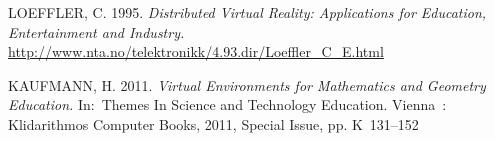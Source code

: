 \begin{thebibliography}{1}

LOEFFLER, C. 1995. \emph{Distributed Virtual Reality: Applications for Education, Entertainment and Industry.} \url{http://www.nta.no/telektronikk/4.93.dir/Loeffler_C_E.html}

KAUFMANN, H. 2011. \emph{Virtual Environments for Mathematics and Geometry Education.} In:~Themes In Science and Technology Education. Vienna~: Klidarithmos Computer Books, 2011, Special Issue, pp. K~131--152




%
%
%
%
%
%
%
%
%
\end{thebibliography}